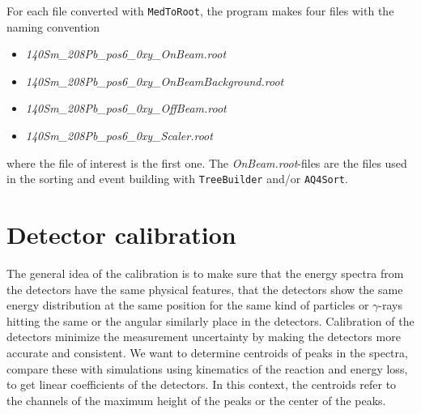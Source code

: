 \documentclass[twoside,english]{uiofysmaster/uiofysmaster}
\newcommand{\ga}{$\gamma$}
\begin{document}
For each file converted with \texttt{MedToRoot}, the program makes four files with the naming convention
\begin{itemize}
	\item \textit{140Sm\_208Pb\_pos6\_0xy\_OnBeam.root} 
	\item \textit{140Sm\_208Pb\_pos6\_0xy\_OnBeamBackground.root}
	\item \textit{140Sm\_208Pb\_pos6\_0xy\_OffBeam.root}
	\item \textit{140Sm\_208Pb\_pos6\_0xy\_Scaler.root} 
\end{itemize}
where the file of interest is the first one. The \textit{OnBeam.root}-files are the files used in the sorting and event building with \texttt{TreeBuilder} and/or \texttt{AQ4Sort}.


\section{Detector calibration}

%

The general idea of the calibration is to make sure that the energy spectra from the detectors have the same physical features, that the detectors show the same energy distribution at the same position for the same kind of particles or \ga-rays hitting the same or the angular similarly place in the detectors.
Calibration of the detectors minimize the measurement uncertainty by making the detectors more accurate and consistent.
We want to determine centroids of peaks in the spectra, compare these with simulations using kinematics of the reaction and energy loss, to get linear coefficients of the detectors. 
In this context, the centroids refer to the channels of the maximum height of the peaks or the center of the peaks. 
\end{document}
